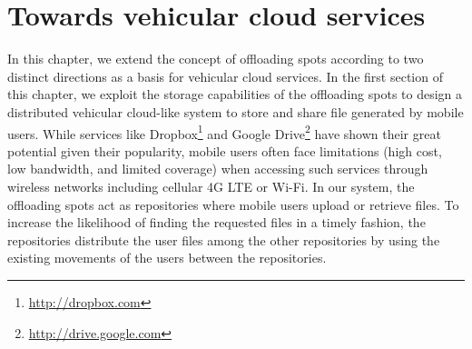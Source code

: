 \chapter{Towards vehicular cloud services}
\label{cha:vehicular-cloud-services}



In this chapter, we extend the concept of offloading spots according to two distinct directions as a basis for vehicular cloud services. In the first section of this chapter, we exploit the storage capabilities of the offloading spots to design a distributed vehicular cloud-like system to store and share file generated by mobile users. While services like Dropbox\footnote{\url{http://dropbox.com}} and Google Drive\footnote{\url{http://drive.google.com}} have shown their great potential given their popularity, mobile users often face limitations (\eg high cost, low bandwidth, and limited coverage) when accessing such services through wireless networks including cellular 4G LTE or Wi-Fi. In our system, the offloading spots act as repositories where mobile users upload or retrieve files. To increase the likelihood of finding the requested files in a timely fashion, the repositories distribute the user files among the other repositories by using the existing movements of the users between the repositories.  



